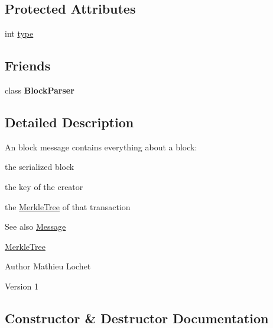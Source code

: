 \subsection*{Protected Attributes}
\begin{DoxyCompactItemize}
\item 
int \mbox{\hyperlink{classMessage_afbfb481c98b13d0deba0bac443bebe29}{type}}
\end{DoxyCompactItemize}
\subsection*{Friends}
\begin{DoxyCompactItemize}
\item 
\mbox{\label{classBlockMessage_a8428b3aeea6607d1ba12e603ff9d015c}} 
class {\bfseries Block\+Parser}
\end{DoxyCompactItemize}


\subsection{Detailed Description}
An block message contains everything about a block\+:
\begin{DoxyItemize}
\item the serialized block
\item the key of the creator
\item the \mbox{\hyperlink{classMerkleTree}{Merkle\+Tree}} of that transaction \begin{DoxySeeAlso}{See also}
\mbox{\hyperlink{classMessage}{Message}} 

\mbox{\hyperlink{classMerkleTree}{Merkle\+Tree}}
\end{DoxySeeAlso}
\begin{DoxyAuthor}{Author}
Mathieu Lochet 
\end{DoxyAuthor}
\begin{DoxyVersion}{Version}
1 
\end{DoxyVersion}

\end{DoxyItemize}

\subsection{Constructor \& Destructor Documentation}
\mbox{\label{classBlockMessage_a0e13dac3bd793b19550db5e72eb30a2c}} 
